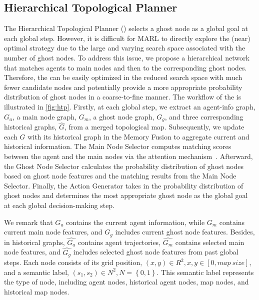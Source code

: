 \subsection{Hierarchical Topological Planner}
The Hierarchical Topological Planner (\planner) selects a ghost node as a global goal at each global step. However, it is difficult for MARL to directly explore the (near) optimal strategy due to the large and varying search space associated with the number of ghost nodes. To address this issue, we propose a hierarchical network that matches agents to main nodes and then to the corresponding ghost nodes. Therefore, the {\planner} can be easily optimized in the reduced search space with much fewer candidate nodes and potentially provide a more appropriate probability distribution of ghost nodes in a coarse-to-fine manner.
The workflow of the {\planner} is illustrated in \cref{fig:htp}.
Firstly, at each global step, we extract an agent-info graph, $G_{a}$, a main node graph, $G_{m}$, a ghost node graph, $G_{g}$, and three corresponding historical graphs, $\hat{G}$, from a merged topological map. Subsequently, we update each $G$ with its historical graph in the Memory Fusion to aggregate current and historical information. The Main Node Selector computes matching scores between the agent and the main nodes via the attention mechanism~\cite{attention}. 
Afterward, the Ghost Node Selector calculates the probability distribution of ghost nodes based on ghost node features and the matching results from the Main Node Selector. 
Finally, the Action Generator takes in the probability distribution of ghost nodes and determines the most appropriate ghost node as the global goal at each global decision-making step.


We remark that $G_{a}$ contains the current agent information, while $G_{m}$ contains current main node features, and $G_{g}$ includes current ghost node features. Besides, in historical graphs, $\hat{G_{a}}$ contains agent trajectories, $\hat{G_{m}}$ contains selected main node features, and $\hat{G_{g}}$ includes selected ghost node features from past global steps.
Each node consists of its grid position, $(x,y)\in R^2, x,y\in [0,map\ size]$, and a semantic label, $(s_1,s_2)\in N^2, N=\left\{0,1\right\}$.
This semantic label represents the type of node, including agent nodes, historical agent nodes, map nodes, and historical map nodes.



